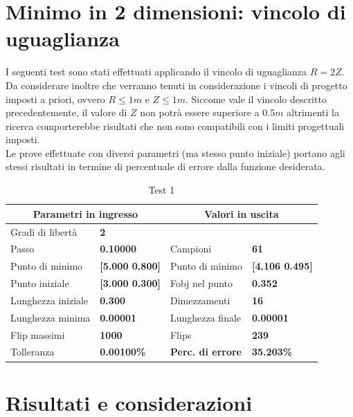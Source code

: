 \documentclass[a4paper, 11pt]{article}
\begin{document}
\newpage
\section{Minimo in 2 dimensioni: vincolo di uguaglianza}

I seguenti test sono stati effettuati applicando il vincolo di uguaglianza $R =
2Z$. Da considerare inoltre che verranno tenuti in considerazione i vincoli di
progetto imposti a priori, ovvero $R \le 1m$ e $Z \le 1m$. Siccome vale il
vincolo descritto precedentemente, il valore di $Z$ non potrà essere superiore a
$0.5m$ altrimenti la ricerca comporterebbe risultati che non sono compatibili
con i limiti progettuali imposti. \\
Le prove effettuate con diversi parametri (ma stesso punto iniziale) portano
agli stessi risultati in termine di percentuale di errore dalla funzione
desiderata.

\begin{table}[h]
    \caption{Test 1}
    \begin{center}
    \begin{tabular}{|l|l|l|l|} 
    \hline
    \multicolumn{2}{|c|}{\textbf{Parametri in ingresso}} & \multicolumn{2}{c|}{\textbf {Valori in uscita}} \\ \hline
    Gradi di libertà  & \textbf{2} &  &  \\ \hline 
    Passo & \textbf{0.10000} & Campioni & \textbf{61} \\ \hline 
    Punto di minimo & \textbf{{[}5.000 0.800{]}} & Punto di minimo & \textbf{{[}4.106 0.495{]}} \\ \hline 
    Punto iniziale & \textbf{{[}3.000 0.300{]}} & Fobj nel punto & \textbf{0.352} \\ \hline 
    Lunghezza iniziale & \textbf{0.300} & Dimezzamenti & \textbf{16} \\ \hline 
    Lunghezza minima & \textbf{0.00001} & Lunghezza finale & \textbf{0.00001} \\ \hline
    Flip massimi & \textbf{1000} & Flips & \textbf{239} \\ \hline 
    Tolleranza & \textbf{0.00100\%} & \textbf{Perc. di errore} & \textbf{35.203\%} \\ \hline 
    \end{tabular} 
    \end{center}
    \end{table}
    

\newpage
\section*{Risultati e considerazioni}
\end{document}
